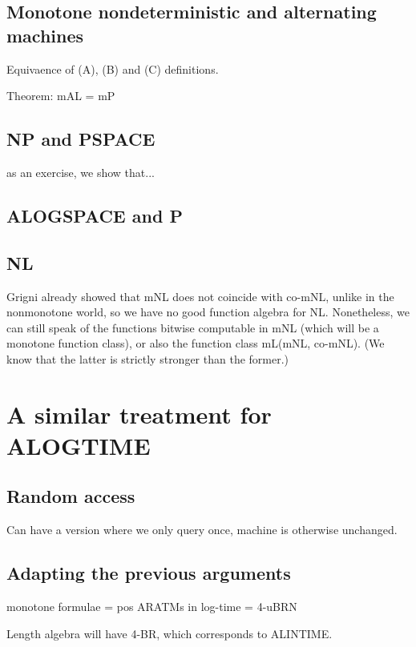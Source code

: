\documentclass{lmcs}
\begin{document}
\subsection{Monotone nondeterministic and alternating machines}

Equivaence of (A), (B) and (C) definitions.

Theorem: mAL = mP


\subsection{NP and PSPACE}
as an exercise, we show that...

\subsection{ALOGSPACE and P}

\subsection{NL}
Grigni already showed that mNL does not coincide with co-mNL, unlike in the nonmonotone world, so we have no good function algebra for NL.
Nonetheless, we can still speak of the functions bitwise computable in mNL (which will be a monotone function class), or also the function class mL(mNL, co-mNL).
(We know that the latter is strictly stronger than the former.)

\section{A similar treatment for ALOGTIME}

\subsection{Random access}
Can have a version where we only query once, machine is otherwise unchanged.

\subsection{Adapting the previous arguments}

monotone formulae = pos ARATMs in log-time = 4-uBRN

Length algebra will have 4-BR, which corresponds to ALINTIME.
\end{document}
